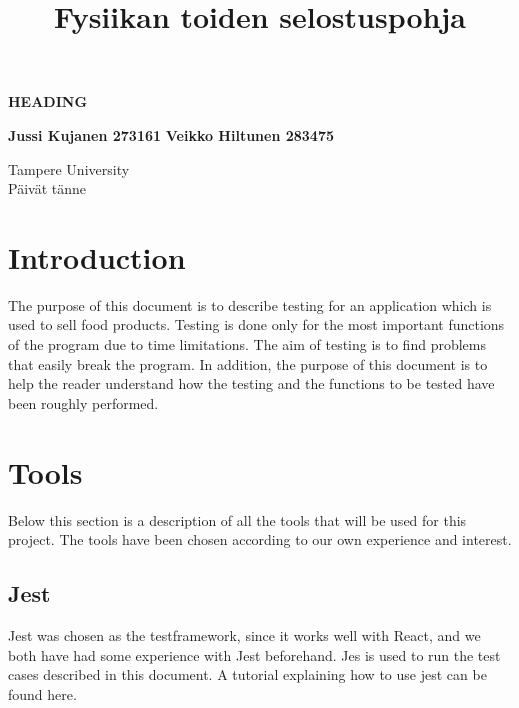 \documentclass[a4paper, 12pt]{article}
\title{Fysiikan toiden selostuspohja}
\begin{document}
\begin{titlepage}
    \begin{center}
        \vspace*{1cm}
 
        \textbf{HEADING}
 
        \vspace{0.5cm}
       
             
        \vspace{1.5cm}

        \textbf{Jussi Kujanen 273161}
        \textbf{Veikko Hiltunen 283475}
 
        \vfill
        \vspace{0.8cm}
        Tampere University\\
        Päivät tänne
    \end{center}
 \end{titlepage} 



\newpage
\thispagestyle{empty}
\tableofcontents

\newpage
\clearpage
{} 

\section{Introduction}

The purpose of this document is to describe testing for an application which is used to sell food products. Testing is done only for the most important 
functions of the program due to time limitations. The aim of testing is to find problems that easily break the program. In addition, the purpose of this 
document is to help the reader understand how the testing and the functions to be tested have been roughly performed. 

\section{Tools}

Below this section is a description of all the tools that will be used for this project. The tools have been chosen according to our own experience and interest. 

    \subsection{Jest}

    Jest\cite{Jest} was chosen as the testframework, since it works well with React, and we both have had some experience with Jest beforehand.
    Jes is used to run the test cases described in this document. A tutorial explaining how to use jest can be found here.\cite{JestTutorial}
\end{document}
